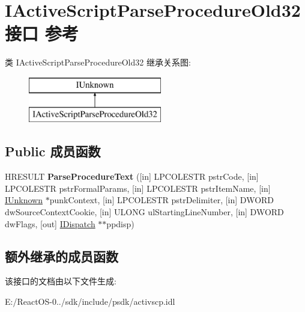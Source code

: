 \hypertarget{interface_i_active_script_parse_procedure_old32}{}\section{I\+Active\+Script\+Parse\+Procedure\+Old32接口 参考}
\label{interface_i_active_script_parse_procedure_old32}
类 I\+Active\+Script\+Parse\+Procedure\+Old32 继承关系图\+:\begin{figure}[H]
\begin{center}
\leavevmode
\includegraphics[height=2.000000cm]{interface_i_active_script_parse_procedure_old32}
\end{center}
\end{figure}
\subsection*{Public 成员函数}
\begin{DoxyCompactItemize}
\item 
\mbox{\label{interface_i_active_script_parse_procedure_old32_ac24777d266245432ced2926741c7fae8}} 
H\+R\+E\+S\+U\+LT {\bfseries Parse\+Procedure\+Text} (\mbox{[}in\mbox{]} L\+P\+C\+O\+L\+E\+S\+TR pstr\+Code, \mbox{[}in\mbox{]} L\+P\+C\+O\+L\+E\+S\+TR pstr\+Formal\+Params, \mbox{[}in\mbox{]} L\+P\+C\+O\+L\+E\+S\+TR pstr\+Item\+Name, \mbox{[}in\mbox{]} \hyperlink{interface_i_unknown}{I\+Unknown} $\ast$punk\+Context, \mbox{[}in\mbox{]} L\+P\+C\+O\+L\+E\+S\+TR pstr\+Delimiter, \mbox{[}in\mbox{]} D\+W\+O\+RD dw\+Source\+Context\+Cookie, \mbox{[}in\mbox{]} U\+L\+O\+NG ul\+Starting\+Line\+Number, \mbox{[}in\mbox{]} D\+W\+O\+RD dw\+Flags, \mbox{[}out\mbox{]} \hyperlink{interface_i_dispatch}{I\+Dispatch} $\ast$$\ast$ppdisp)
\end{DoxyCompactItemize}
\subsection*{额外继承的成员函数}


该接口的文档由以下文件生成\+:\begin{DoxyCompactItemize}
\item 
E\+:/\+React\+O\+S-\/0../sdk/include/psdk/activscp.\+idl\end{DoxyCompactItemize}
